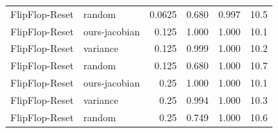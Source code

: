 \begin{tabular}{llrrrr}
FlipFlop-Reset & random & 0.0625 & 0.680 & 0.997 & 10.5 \\
FlipFlop-Reset & ours-jacobian & 0.125 & 1.000 & 1.000 & 10.1 \\
FlipFlop-Reset & variance & 0.125 & 0.999 & 1.000 & 10.2 \\
FlipFlop-Reset & random & 0.125 & 0.680 & 1.000 & 10.7 \\
FlipFlop-Reset & ours-jacobian & 0.25 & 1.000 & 1.000 & 10.1 \\
FlipFlop-Reset & variance & 0.25 & 0.994 & 1.000 & 10.3 \\
FlipFlop-Reset & random & 0.25 & 0.749 & 1.000 & 10.6 \\
\bottomrule
\end{tabular}
